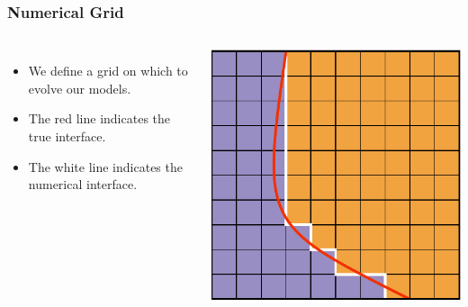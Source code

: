 \documentclass{beamer}
\begin{document}
\begin{frame}
\frametitle{Numerical Grid}
\begin{columns}
\begin{itemize}
\item{We define a grid on which to evolve our models.}
\item{The red line indicates the true interface.}
\item{The white line indicates the numerical interface.}
\end{itemize}
\includegraphics[width=\textwidth]{../images/multimodel_captured.pdf}
\end{columns}
\end{frame}
\end{document}
